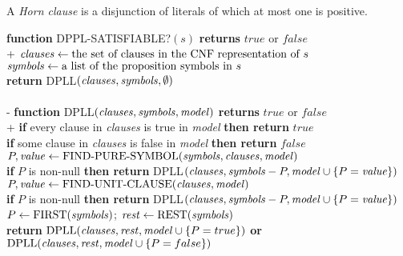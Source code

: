 \documentclass{article}
\begin{document}
\begin{definition}
    A \emph{Horn clause} is a disjunction of literals of which at most
    one is positive.
\end{definition}

\begin{pseudo}
    \textbf{function} DPPL-SATISFIABLE?$(s)$ \textbf{returns} $true$ or $false$\\+
        $\text{\emph{clauses}}\leftarrow\text{the set of clauses in the CNF representation of }s$\\
        $\text{\emph{symbols}}\leftarrow\text{a list of the proposition symbols in }s$\\
        \textbf{return} DPLL$(\text{\emph{clauses}}, \text{\emph{symbols}}, \emptyset)$
    \\\\-
    \textbf{function} DPLL$(\text{\emph{clauses}}, \text{\emph{symbols}}, \text{\emph{model}})$ \textbf{returns} $true$ or $false$\\+
        \textbf{if} every clause in \emph{clauses} is true in \emph{model} \textbf{then return} $true$\\
        \textbf{if} some clause in \emph{clauses} is false in \emph{model} \textbf{then return} $false$\\
        $P,\text{\emph{value}}\leftarrow\text{FIND-PURE-SYMBOL}(\text{\emph{symbols}},\text{\emph{clauses}},\text{\emph{model}})$\\
        \textbf{if} $P$ is non-null \textbf{then return} DPLL$(\text{\emph{clauses}}, \text{\emph{symbols}}-P,\text{\emph{model}}\cup\{P=\text{\emph{value}}\})$\\
        $P,\text{\emph{value}}\leftarrow\text{FIND-UNIT-CLAUSE}(\text{\emph{clauses}}, \text{\emph{model}})$\\
        \textbf{if} $P$ is non-null \textbf{then return} DPLL$(\text{\emph{clauses}}, \text{\emph{symbols}}-P,\text{\emph{model}}\cup\{P=\text{\emph{value}}\})$\\
        $P\leftarrow\text{FIRST}(\text{\emph{symbols}})$; $\text{\emph{rest}}\leftarrow\text{REST}(\text{\emph{symbols}})$\\
        \textbf{return} $\text{DPLL}(\text{\emph{clauses}}, \text{\emph{rest}}, \text{\emph{model}}\cup\{P=true\})$ \textbf{or}
                        $\text{DPLL}(\text{\emph{clauses}}, \text{\emph{rest}}, \text{\emph{model}}\cup\{P=false\})$
\end{pseudo}
\end{document}
